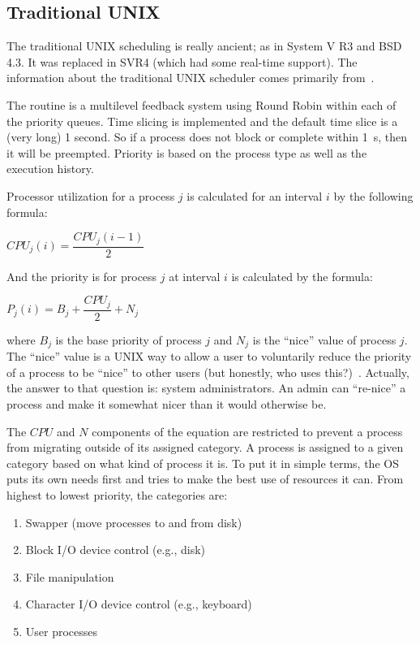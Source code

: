\subsection*{Traditional UNIX}

The traditional UNIX scheduling is really ancient; as in System V R3 and BSD 4.3. It was replaced in SVR4 (which had some real-time support). The information about the traditional UNIX scheduler comes primarily from~\cite{osi}.

The routine is a multilevel feedback system using Round Robin within each of the priority queues. Time slicing is implemented and the default time slice is a (very long) 1 second. So if a process does not block or complete within 1~s, then it will be preempted. Priority is based on the process type as well as the execution history.

Processor utilization for a process $j$ is calculated for an interval $i$ by the following formula:

\begin{center}
$CPU_{j}(i) = \dfrac{CPU_{j}(i - 1)}{2}$
\end{center}

And the priority is for process $j$ at interval $i$ is calculated by the formula:

\begin{center}
$P_{j}(i) = B_{j} + \dfrac{CPU_{j}}{2} + N_{j}$
\end{center}

where $B_{j}$ is the base priority of process $j$ and $N_{j}$ is the ``nice'' value of process $j$. The ``nice'' value is a UNIX way to allow a user to voluntarily reduce the priority of a process to be ``nice'' to other users (but honestly, who uses this?)~\cite{mos}. Actually, the answer to that question is: system administrators. An admin can ``re-nice'' a process and make it somewhat nicer than it would otherwise be.

The $CPU$ and $N$ components of the equation are restricted to prevent a process from migrating outside of its assigned category. A process is assigned to a given category based on what kind of process it is. To put it in simple terms, the OS puts its own needs first and tries to make the best use of resources it can. From highest to lowest priority, the categories are:

\begin{enumerate}
	\item Swapper (move processes to and from disk)
	\item Block I/O device control (e.g., disk)
	\item File manipulation
	\item Character I/O device control (e.g., keyboard)
	\item User processes
\end{enumerate}

